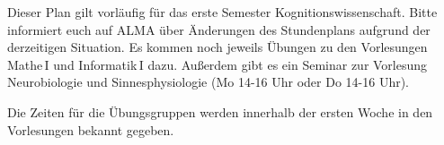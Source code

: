 Dieser Plan gilt vorläufig für das erste Semester Kognitionswissenschaft. Bitte informiert euch auf ALMA über Änderungen des Stundenplans aufgrund der derzeitigen Situation.
Es kommen noch jeweils Übungen zu den Vorlesungen Mathe\,I und Informatik\,I %
dazu.
Außerdem gibt es ein Seminar zur Vorlesung Neurobiologie und Sinnesphysiologie (Mo 14-16 Uhr oder Do 14-16 Uhr).

Die Zeiten für die Übungsgruppen werden innerhalb der ersten Woche in den Vorlesungen bekannt gegeben.
